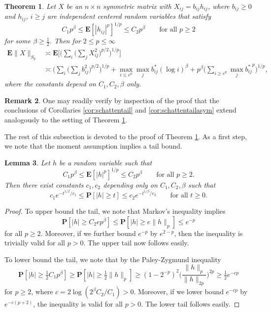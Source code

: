 \documentclass[10pt,reqno]{amsart}
\newtheorem{thm}{Theorem}[section]
\newtheorem{lem}[thm]{Lemma}
\theoremstyle{definition}
\newtheorem{rem}[thm]{Remark}
\numberwithin{equation}{section}
\numberwithin{figure}{section}
\numberwithin{table}{section}
\begin{document}
\begin{thm}
\label{thm:heavy}
Let $X$ be an $n\times n$ symmetric matrix with 
$X_{ij}=b_{ij}h_{ij}$, where $b_{ij}\ge 0$ and $h_{ij}$, $i\ge j$ are 
independent centered random variables that satisfy 
$$
	C_1p^{\beta} \le \mathbf{E}[|h_{ij}|^p]^{1/p} \le
	C_2p^{\beta}
	\qquad\mbox{for all }p\ge 2
$$ 
for some $\beta\ge \tfrac{1}{2}$.
Then for $2\le p\le\infty$
\begin{align*}
	\mathbf{E}\|X\|_{S_p} &\asymp
	\mathbf{E}\Bigg[
	\Bigg(\sum_i\Bigg(\sum_j X_{ij}^2\Bigg)^{p/2}\Bigg)^{1/p}
	\Bigg] 
	\\
	&\asymp
	\Bigg(\sum_i\Bigg(\sum_j b_{ij}^2\Bigg)^{p/2}\Bigg)^{1/p} +
	\max_{i\le e^p}\max_j b_{ij}^*(\log i)^{\beta} +
	p^\beta\Bigg(
	\sum_{i\ge e^p}\max_j {b_{ij}^{*}}^p
	\Bigg)^{1/p},
\end{align*}
where the constants depend on $C_1,C_2,\beta$ only.
\end{thm}

\begin{rem}
One may readily verify by inspection of the proof that the conclusions of 
Corollaries \ref{cor:schattentail} and \ref{cor:schattentailasym} 
extend analogously to the setting of Theorem \ref{thm:heavy}.
\end{rem}

The rest of this subsection is devoted to the proof of Theorem 
\ref{thm:heavy}. As a first step, we note that the moment assumption 
implies a tail bound.

\begin{lem}
\label{lem:paley}
Let $h$ be a random variable such that
$$
	C_1p^{\beta} \le \mathbf{E}[|h|^p]^{1/p} \le
	C_2p^{\beta}
	\qquad\mbox{for all }p\ge 2.
$$
Then there exist constants $c_1,c_2$ depending only on
$C_1,C_2,\beta$ such that
$$
	c_1e^{-t^{1/\beta}/c_1} \le
	\mathbf{P}[|h|\ge t] \le c_2e^{-t^{1/\beta}/c_2}
	\qquad\mbox{for all }t\ge 0.
$$
\end{lem}

\begin{proof}
To upper bound the tail, we note that Markov's inequality implies
$$
	\mathbf{P}[|h|\ge C_2ep^\beta] \le
	\mathbf{P}[|h|\ge e\|h\|_p] \le
	e^{-p}
$$
for all $p\ge 2$. Moreover, if we further bound $e^{-p}$ by $e^{2-p}$, 
then the inequality is trivially valid for all $p>0$. The upper tail now 
follows easily.

To lower bound the tail, we note that by the Paley-Zygmund inequality
$$
	\mathbf{P}[|h|\ge \tfrac{1}{2}C_1p^\beta] \ge
	\mathbf{P}[|h|\ge \tfrac{1}{2}\|h\|_p]
	\ge
	(1-2^{-p})^2 \bigg(\frac{\|h\|_p}{\|h\|_{2p}}\bigg)^{2p}
	\ge
	\tfrac{1}{2}
	e^{-cp}
$$
for $p\ge 2$, where $c=2\log(2^\beta C_2/C_1)>0$. Moreover, if we 
lower bound $e^{-cp}$ by $e^{-c(p+2)}$, the inequality is valid 
for all $p>0$.  The lower tail follows easily.
\end{proof}
\end{document}
